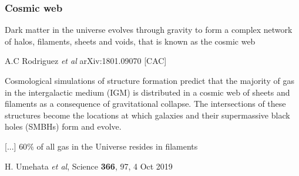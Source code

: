 \begin{frame}
  \frametitle{Cosmic web}

      \alert{Dark matter} in the universe evolves through gravity to form a complex network
      of halos, filaments, sheets and voids, that is known as the cosmic web

      {\tiny A.C Rodriguez \emph{et al} arXiv:1801.09070 [CAC]}

    Cosmological simulations of structure formation predict that the
    \alert{majority of gas} in the intergalactic medium (IGM) is distributed
    in a cosmic web of sheets and filaments as a consequence of
    gravitational collapse.  The intersections of these structures
    become the locations at which galaxies and their supermassive
    black holes (SMBHs) form and evolve.

    [...] %
    \alert{$60\%$ of all gas} in the
    Universe resides in filaments
    
    {\tiny H. Umehata \emph{et al}, Science  \textbf{366}, 97, 4 Oct 2019}



\end{frame}

